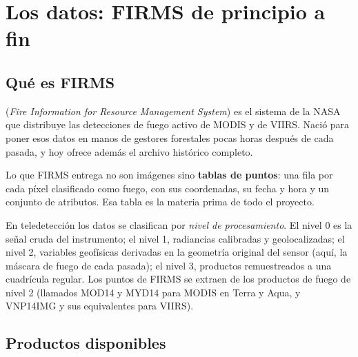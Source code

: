 \chapter{Los datos: FIRMS de principio a fin}\label{cap:firms}


\section{Qué es FIRMS}

 (\emph{Fire Information for Resource Management System}) es el sistema de la
NASA que distribuye las detecciones de fuego activo de MODIS y de VIIRS. Nació para poner esos
datos en manos de gestores forestales pocas horas después de cada pasada, y hoy ofrece además
el archivo histórico completo.

Lo que FIRMS entrega no son imágenes sino \textbf{tablas de puntos}: una fila por cada píxel
clasificado como fuego, con sus coordenadas, su fecha y hora y un conjunto de atributos. Esa
tabla es la materia prima de todo el proyecto.

\begin{nota}
En teledetección los datos se clasifican por \emph{nivel de procesamiento}. El nivel 0 es la
señal cruda del instrumento; el nivel 1, radiancias calibradas y geolocalizadas; el nivel 2,
variables geofísicas derivadas en la geometría original del sensor (aquí, la máscara de fuego
de cada pasada); el nivel 3, productos remuestreados a una cuadrícula regular. Los puntos de
FIRMS se extraen de los productos de fuego de nivel 2 (llamados MOD14 y MYD14 para MODIS en
Terra y Aqua, y VNP14IMG y sus equivalentes para VIIRS).
\end{nota}

\section{Productos disponibles}


